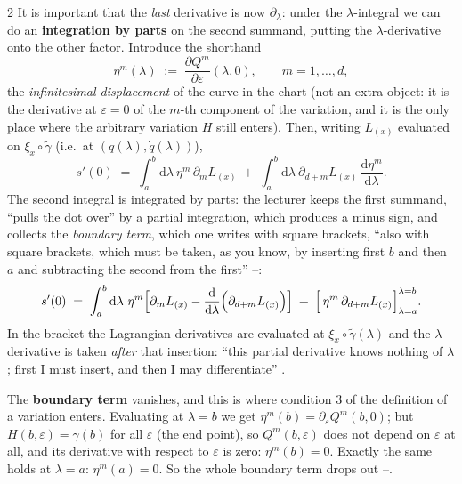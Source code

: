 \begin{paracol}{2}
It is important that the \emph{last} derivative is now $\partial_\lambda$: under the $\lambda$-integral we can do an \textbf{integration by parts} on the second summand, putting the $\lambda$-derivative onto the other factor. Introduce the shorthand
\begin{equation}\label{eq:var-eta}
  \eta^m(\lambda)\;:=\;\frac{\partial Q^m}{\partial\varepsilon}(\lambda,0),\qquad m=1,\dots,d,
\end{equation}
the \emph{infinitesimal displacement} of the curve in the chart (not an extra object: it is the derivative at $\varepsilon=0$ of the $m$-th component of the variation, and it is the only place where the arbitrary variation $H$ still enters). Then, writing $L_{(x)}$ evaluated on $\xi_x\circ\tilde\gamma$ (i.e.\ at $(q(\lambda),\dot q(\lambda))$),
\begin{equation}\label{eq:var-parts}
  s'(0)\;=\;\int_a^b\mathrm d\lambda\ \eta^m\,\partial_mL_{(x)}\;+\;\int_a^b\mathrm d\lambda\ \partial_{d+m}L_{(x)}\,\frac{\mathrm d\eta^m}{\mathrm d\lambda}.
\end{equation}
The second integral is integrated by parts: the lecturer keeps the first summand, ``pulls the dot over'' by a partial integration, which produces a minus sign, and collects the \emph{boundary term}, which one writes with square brackets, ``also with square brackets, which must be taken, as you know, by inserting first $b$ and then $a$ and subtracting the second from the first'' --:
\begin{equation}\label{eq:var-parts2}
  s'(0)\;=\;\int_a^b\mathrm d\lambda\ \eta^m\Bigl[\partial_mL_{(x)}-\frac{\mathrm d}{\mathrm d\lambda}\Bigl(\partial_{d+m}L_{(x)}\Bigr)\Bigr]\;+\;\Bigl[\,\eta^m\,\partial_{d+m}L_{(x)}\Bigr]_{\lambda=a}^{\lambda=b}.
\end{equation}
In the bracket the Lagrangian derivatives are evaluated at $\xi_x\circ\tilde\gamma(\lambda)$ and the $\lambda$-derivative is taken \emph{after} that insertion: ``this partial derivative knows nothing of $\lambda$; first I must insert, and then I may differentiate'' .

The \textbf{boundary term} vanishes, and this is where condition 3 of the definition of a variation enters. Evaluating at $\lambda=b$ we get $\eta^m(b)=\partial_\varepsilon Q^m(b,0)$; but $H(b,\varepsilon)=\gamma(b)$ for all $\varepsilon$ (the end point), so $Q^m(b,\varepsilon)$ does not depend on $\varepsilon$ at all, and its derivative with respect to $\varepsilon$ is zero: $\eta^m(b)=0$. Exactly the same holds at $\lambda=a$: $\eta^m(a)=0$. So the whole boundary term drops out --.


\end{paracol}
